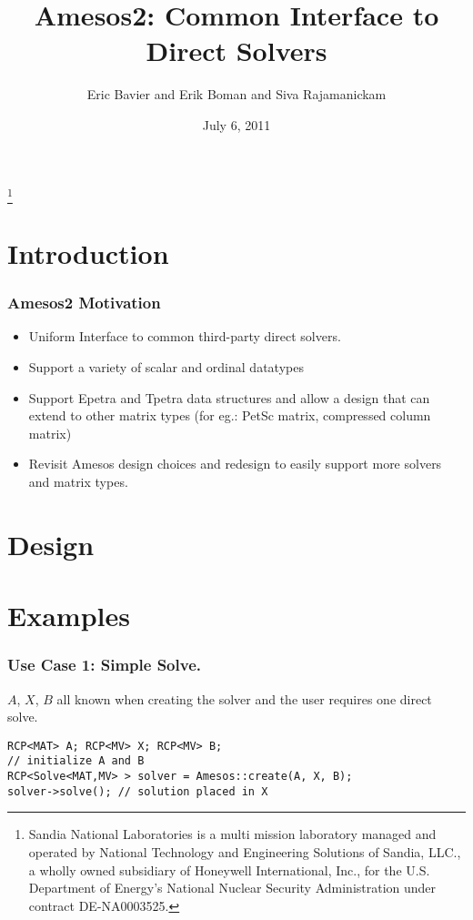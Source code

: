 \documentclass[xcolor=dvipsnames]{beamer}
\title[Amesos2]{Amesos2: Common Interface to Direct Solvers}
\author[Bavier,Boman,Rajamanickam]{Eric Bavier and Erik Boman and Siva Rajamanickam}
\institute[SNL]{
Sandia National Laboratories
}
\date[]{July 6, 2011}
\begin{document}
\begin{frame}[plain]
  \titlepage
  \footnote{\tiny{Sandia National Laboratories is a multi mission laboratory managed and operated by National Technology and Engineering Solutions of Sandia, LLC., a wholly owned subsidiary of Honeywell International, Inc., for the U.S. Department of Energy’s National Nuclear Security Administration under contract DE-NA0003525.}}
\end{frame}

\section{Introduction}

\begin{frame}
  \frametitle{Amesos2 Motivation}

  \begin{itemize}
  \item Uniform Interface to common third-party direct solvers.
    \medskip
  \item Support a variety of scalar and ordinal datatypes
    \medskip
  \item Support Epetra and Tpetra data structures and allow a design that can
    extend to other matrix types (for eg.: PetSc matrix, compressed column
    matrix)
    \medskip
  \item Revisit Amesos design choices and redesign to easily support more
    solvers and matrix types.
  \end{itemize}
\end{frame}

\section{Design}

\section{Examples}

\begin{frame}[fragile]          %
  \frametitle{Use Case 1: Simple Solve.}

  $A$, $X$, $B$ all known when creating the solver and the user
  requires one direct solve.

  \begin{lstlisting}
RCP<MAT> A; RCP<MV> X; RCP<MV> B;
// initialize A and B
RCP<Solve<MAT,MV> > solver = Amesos::create(A, X, B);
solver->solve(); // solution placed in X
  \end{lstlisting}
\end{frame}
\end{document}
